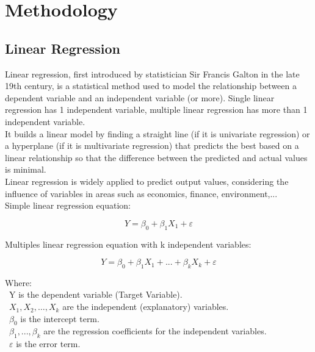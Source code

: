 \documentclass{ieeeojies}
\begin{document}
\section{Methodology}
\subsection{Linear Regression}
Linear regression, first introduced by statistician Sir Francis Galton in the late 19th century, is a statistical method used to model the relationship between a dependent variable and an independent variable (or more). Single linear regression has 1 independent variable, multiple linear regression has more than 1 independent variable.\\
It builds a linear model by finding a straight line (if it is univariate regression) or a hyperplane (if it is multivariate regression) that predicts the best based on a linear relationship so that the difference between the predicted and actual values is minimal. \\
Linear regression is widely applied to predict output values, considering the influence of variables in areas such as economics, finance, environment,...\\
Simple linear regression equation: 
\begin{samepage}
\[Y=\beta_0+\beta_1X_1+\varepsilon\]
\end{samepage}
Multiples linear regression equation with k independent variables:
\begin{samepage}
\[Y=\beta_0+\beta_1X_1+...+\beta_kX_k+\varepsilon\]
\end{samepage}
Where:\\
	\indent\textbullet\ Y is the dependent variable (Target Variable).\\
	\indent\textbullet\ \(X_1, X_2, \ldots, X_k\) are the independent (explanatory) variables.\\
	\indent\textbullet\ \(\beta_0\) is the intercept term.\\
	\indent\textbullet\ \(\beta_1,..., \beta_k\) are the regression coefficients for the independent variables.\\
	\indent\textbullet\ \(\varepsilon\) is the error term.
\end{document}
